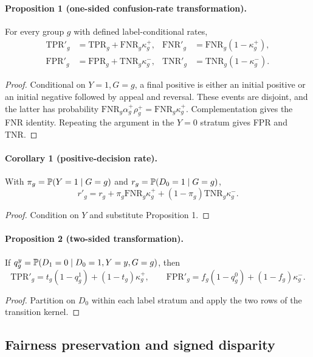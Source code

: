 \paragraph{Proposition 1 (one-sided confusion-rate transformation).}
For every group $g$ with defined label-conditional rates,
\begin{align*}
 \mathrm{TPR}'_g&=\mathrm{TPR}_g+\mathrm{FNR}_g\kappa_g^+,&
 \mathrm{FNR}'_g&=\mathrm{FNR}_g(1-\kappa_g^+),\\
 \mathrm{FPR}'_g&=\mathrm{FPR}_g+\mathrm{TNR}_g\kappa_g^-,&
 \mathrm{TNR}'_g&=\mathrm{TNR}_g(1-\kappa_g^-).
\end{align*}

\begin{proof}
Conditional on $Y=1,G=g$, a final positive is either an initial positive or
an initial negative followed by appeal and reversal.  These events are
disjoint, and the latter has probability
$\mathrm{FNR}_g\alpha_g^+\rho_g^+=\mathrm{FNR}_g\kappa_g^+$.
Complementation gives the FNR identity.  Repeating the argument in the
$Y=0$ stratum gives FPR and TNR.
\end{proof}

\paragraph{Corollary 1 (positive-decision rate).}
With $\pi_g=\mathbb{P}(Y=1\mid G=g)$ and
$r_g=\mathbb{P}(D_0=1\mid G=g)$,
\[
r'_g=r_g+\pi_g\mathrm{FNR}_g\kappa_g^+
 +(1-\pi_g)\mathrm{TNR}_g\kappa_g^-.
\]

\begin{proof}
Condition on $Y$ and substitute Proposition 1.
\end{proof}

\paragraph{Proposition 2 (two-sided transformation).}
If $q_g^y=\mathbb{P}(D_1=0\mid D_0=1,Y=y,G=g)$, then
\[
 \mathrm{TPR}'_g=t_g(1-q_g^1)+(1-t_g)\kappa_g^+,
 \qquad
 \mathrm{FPR}'_g=f_g(1-q_g^0)+(1-f_g)\kappa_g^-.
\]

\begin{proof}
Partition on $D_0$ within each label stratum and apply the two rows of the
transition kernel.
\end{proof}

\subsection{Fairness preservation and signed disparity}

